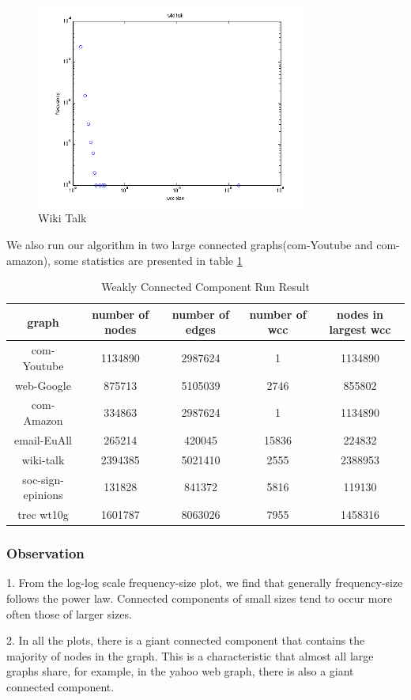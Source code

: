 \begin{figure}[!htbf]
\begin{center}
     \includegraphics[width=0.8\textwidth]{FIG/t3_wiki_talk.png} 
\caption{Wiki Talk}
\label{t3:5}
\end{center}
\end{figure}

We also run our algorithm in two large connected graphs(com-Youtube and com-amazon), some statistics are presented in table \ref{tbl:wcc}
\begin{table}[!htbf]
\caption{Weakly Connected Component Run Result}
\begin{center}
\begin{tabular}{|c|c|c|c|c|}
\hline \hline
graph & number of nodes & number of edges & number of wcc & nodes in largest wcc \\
\hline
com-Youtube & 1134890 & 2987624 & 1 & 1134890 \\
web-Google & 875713 & 5105039 & 	2746 &  855802 \\ 
com-Amazon & 334863 & 2987624 & 1 & 1134890 \\
email-EuAll & 265214 & 420045 & 15836 & 224832 \\
wiki-talk & 2394385 & 5021410  & 2555  & 2388953 \\
soc-sign-epinions & 131828  & 841372  & 5816 & 119130 \\
trec wt10g & 1601787  & 8063026  & 7955 & 1458316 \\
\hline
\end{tabular}
\end{center}
\label{tbl:wcc}
\end{table}%

 
\subsubsection{Observation}
1. From the log-log scale frequency-size plot, we find that generally frequency-size follows the power law. Connected components of small sizes tend to occur more often those of larger sizes.

2. In all the plots, there is a giant connected component that contains the majority of nodes in the graph. This is a characteristic that almost all large graphs share, for example, in the yahoo web graph, there is also a giant connected component. 




